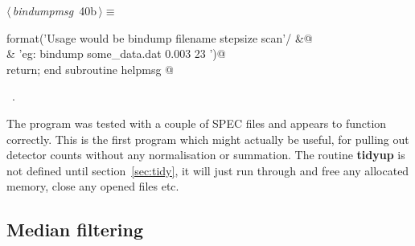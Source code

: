 \documentclass[10pt,a4paper,notitlepage]{article}
\newcommand{\code}[1]{\textbf{\textsf{#1}}} %
\begin{document}
\begin{flushleft} \small
\begin{minipage}{\linewidth}\label{scrap44}\raggedright\small
{} $\langle\,${\it bindumpmsg}\nobreak\ {\footnotesize {40b}}$\,\rangle\equiv$
\vspace{-1ex}
\begin{list}{}{} \item
\mbox{}  format('Usage would be bindump filename stepsize scan'/         &@\\
\mbox{}\verb@     & 'eg: bindump some_data.dat 0.003 23 ')@\\
\mbox{}\verb@      return; end subroutine helpmsg                                         @{\NWsep}
\end{list}
\vspace{-1.5ex}
\footnotesize
\begin{list}{}{\setlength{\itemsep}{-\parsep}\setlength{\itemindent}{-\leftmargin}}
\item \NWtxtMacroRefIn\ .

\item{}
\end{list}
\end{minipage}\vspace{4ex}
\end{flushleft}
The program was tested with a couple of SPEC files and appears to function
correctly. This is the first program which might actually be useful, for 
pulling out detector counts without any normalisation or summation.
The routine \code{tidyup} is not defined until section~\ref{sec:tidy}, it will 
just run through and free any allocated memory, close any opened files etc.

\subsection{Median filtering}
\end{document}
